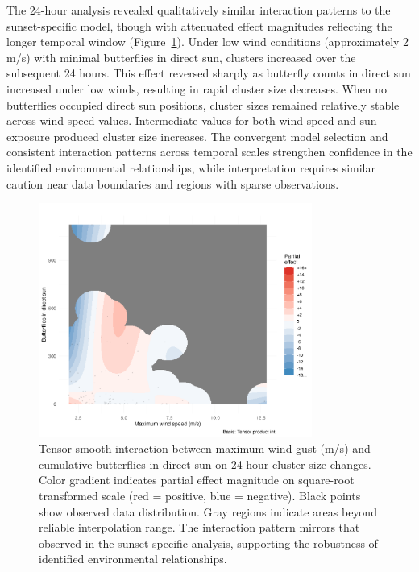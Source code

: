 The 24-hour analysis revealed qualitatively similar interaction patterns to the sunset-specific model, though with attenuated effect magnitudes reflecting the longer temporal window (Figure~\ref{fig:interaction_wind_sun_24hr}). Under low wind conditions (approximately 2 m/s) with minimal butterflies in direct sun, clusters increased over the subsequent 24 hours. This effect reversed sharply as butterfly counts in direct sun increased under low winds, resulting in rapid cluster size decreases. When no butterflies occupied direct sun positions, cluster sizes remained relatively stable across wind speed values. Intermediate values for both wind speed and sun exposure produced cluster size increases. The convergent model selection and consistent interaction patterns across temporal scales strengthen confidence in the identified environmental relationships, while interpretation requires similar caution near data boundaries and regions with sparse observations.

\begin{figure}[htbp]
    \centering
    \includegraphics[width=0.8\textwidth]{supplemental/results/24hr/figures/interaction_wind_x_sun_binned.png}
    \caption{Tensor smooth interaction between maximum wind gust (m/s) and cumulative butterflies in direct sun on 24-hour cluster size changes. Color gradient indicates partial effect magnitude on square-root transformed scale (red = positive, blue = negative). Black points show observed data distribution. Gray regions indicate areas beyond reliable interpolation range. The interaction pattern mirrors that observed in the sunset-specific analysis, supporting the robustness of identified environmental relationships.}
    \label{fig:interaction_wind_sun_24hr}
\end{figure}
